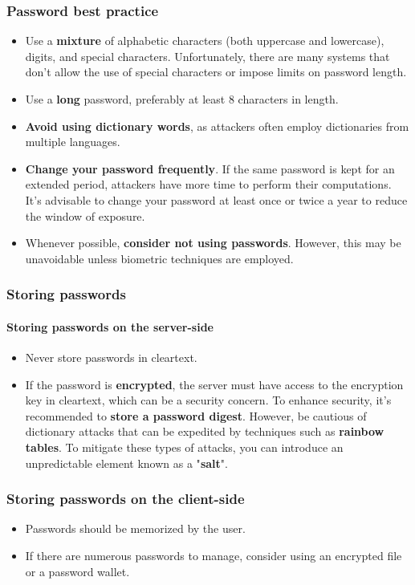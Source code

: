 \subsubsection{Password best practice}
\begin{itemize}
	\item Use a \textbf{mixture} of alphabetic characters (both uppercase and lowercase), digits, and special characters. Unfortunately, there are many systems that don't allow the use of special characters or impose limits on password length.
	\item Use a \textbf{long} password, preferably at least 8 characters in length.
	\item \textbf{Avoid using dictionary words}, as attackers often employ dictionaries from multiple languages.
	\item \textbf{Change your password frequently}. If the same password is kept for an extended period, attackers have more time to perform their computations. It's advisable to change your password at least once or twice a year to reduce the window of exposure.
	\item Whenever possible, \textbf{consider not using passwords}. However, this may be unavoidable unless biometric techniques are employed.
\end{itemize}

\subsubsection{Storing passwords}
\paragraph{Storing passwords on the server-side}
\begin{itemize}
	\item Never store passwords in cleartext.
	\item If the password is \textbf{encrypted}, the server must have access to the encryption key in cleartext, which can be a security concern. To enhance security, it's recommended to \textbf{store a password digest}. However, be cautious of dictionary attacks that can be expedited by techniques such as \textbf{rainbow tables}. To mitigate these types of attacks, you can introduce an unpredictable element known as a "\textbf{salt}".
\end{itemize}


\subsubsection{Storing passwords on the client-side}
\begin{itemize}
	\item Passwords should be memorized by the user.
	\item If there are numerous passwords to manage, consider using an encrypted file or a password wallet.
\end{itemize}



